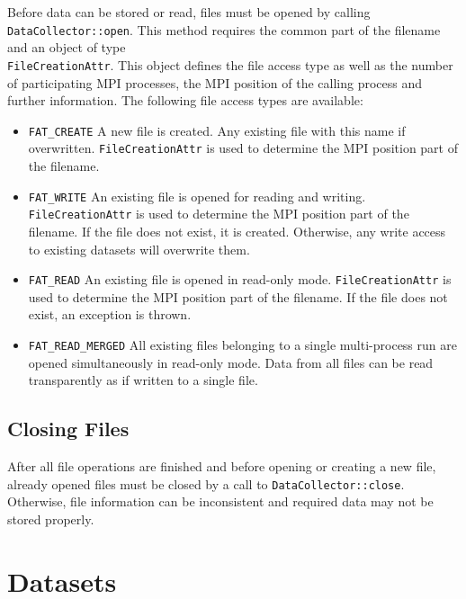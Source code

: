 \documentclass[a4paper,10pt,BCOR12mm]{report}
\newcommand{\code}[1]{\small \texttt{#1}}
\begin{document}
Before data can be stored or read, files must be opened by calling
\code{DataCollector::open}. This method requires the common part of the filename
and an object of type \\ \code{FileCreationAttr}.
This object defines the file access type as well as the number of
participating MPI processes, the MPI position of the calling process and further information.
The following file access types are available:
\begin{itemize}
	\item \code{FAT\_CREATE}
	A new file is created. Any existing file with this name if overwritten.
	\code{FileCreationAttr} is used to determine the MPI position part of the filename.

	\item \code{FAT\_WRITE}
	An existing file is opened for reading and writing.
	\code{FileCreationAttr} is used to determine the MPI position part of the filename.
	If the file does not exist, it is created.
	Otherwise, any write access to existing datasets will overwrite them.

	\item \code{FAT\_READ}
	An existing file is opened in read-only mode.
	\code{FileCreationAttr} is used to determine the MPI position part of the filename.
	If the file does not exist, an exception is thrown.

	\item \code{FAT\_READ\_MERGED}
	All existing files belonging to a single multi-process run are opened simultaneously in read-only mode.
	Data from all files can be read transparently as if written to a single file.
\end{itemize}

\subsection{Closing Files}

After all file operations are finished and before opening or creating a new file,
already opened files must be closed by a call to \code{DataCollector::close}.
Otherwise, file information can be inconsistent and required data may not
be stored properly.


\section{Datasets}
\end{document}
